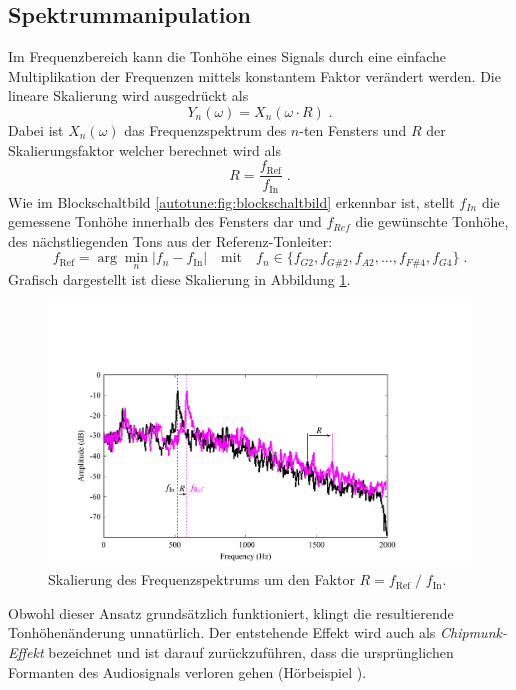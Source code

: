 \subsection{Spektrummanipulation
\label{autotune:subsection:spektrumManipulation}}
Im Frequenzbereich kann die Tonhöhe eines Signals durch eine einfache Multiplikation der Frequenzen mittels konstantem Faktor verändert werden.
Die lineare Skalierung wird ausgedrückt als
\begin{equation}
    Y_n(\omega)
    =
    X_n(\omega \cdot R) \;.
\end{equation}
Dabei ist $X_n(\omega)$ das Frequenzspektrum des $n$-ten Fensters und $R$ der Skalierungsfaktor welcher berechnet wird als
\begin{equation}
    R
    =
    \frac{f_{\text{Ref}}}{{f_{\text{In}}}} \;.
\end{equation}
Wie im Blockschaltbild \ref{autotune:fig:blockschaltbild} erkennbar ist,
stellt $f_{In}$ die gemessene Tonhöhe innerhalb des Fensters dar und $f_{Ref}$ die gewünschte Tonhöhe,
des nächstliegenden Tons aus der Referenz-Tonleiter:
\begin{equation}
    f_{\text{Ref}}
    =
    \arg\min_n \left| f_n - f_{\text{In}} \right|
    \quad \text{mit} \quad
    f_n \in \{ f_{G2}, f_{G\#2}, f_{A2}, \ldots, f_{F\#4}, f_{G4} \} \; .
\end{equation}
Grafisch dargestellt ist diese Skalierung in Abbildung \ref{autotune:fig:spektrumManipulation}.
\begin{figure}
    \centering
    \includegraphics[width=\textwidth]{papers/autotune/images/Spektrum-Manipulation.pdf}
    \caption{Skalierung des Frequenzspektrums um den Faktor $R = f_\text{Ref} \;/\;f_\text{In}$\;.}
    \label{autotune:fig:spektrumManipulation}
\end{figure}
Obwohl dieser Ansatz grundsätzlich funktioniert, klingt die resultierende Tonhöhenänderung unnatürlich.
Der entstehende Effekt wird auch als \emph{Chipmunk-Effekt} bezeichnet und ist darauf zurückzuführen,
dass die ursprünglichen Formanten des Audiosignals verloren gehen (Hörbeispiel \cite{autotune:audioExampleChipmunkEffect}).

